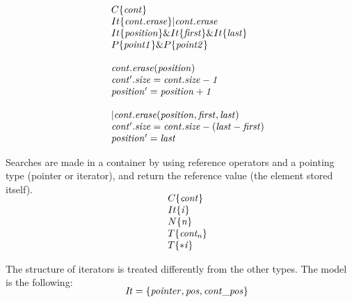 \documentclass[a4paper]{llncs}
\begin{document}
\[\begin{array}{r@{\:\:}c@{\:\:}l}\label{erase-model}
\\[-5ex]
\ &  & \:	C\{\mathit{cont}\}\\
	&  & \: It\{\mathit{cont.erase}\}|\mathit{cont.erase}\\
	&  & \: It\{\mathit{position}\} \& It\{\mathit{first}\} \& It\{\mathit{last}\}\\
	&  & \: P\{\mathit{point1}\} \& P\{\mathit{point2}\}\\
	& &	\: \\
	&  & \: \mathit{cont.erase} (\mathit{position})\\
	&  & \:	\mathit{cont'.size} = \mathit{cont.size} - \mathit{1}\\
	&   & \:	\mathit{position'} = \mathit{position} + \mathit{1}\\
	& &	\: \\
	&  & \:| \mathit{cont.erase} (\mathit{position}, \mathit{first}, \mathit{last})\\
	&   & \:	\mathit{cont'.size} = \mathit{cont.size} -(\mathit{last} - \mathit{first})\\
	&   & \:	\mathit{position'} = \mathit{last}\\
\end{array}
\]

	Searches are made in a container by using reference operators and a pointing type (pointer or iterator), and return the reference value (the element stored itself).\\

\[\begin{array}{r@{\:\:}c@{\:\:}l}\label{search-model}
\\[-5ex]
\ &  &\:	C\{\mathit{cont}\}\\
	&  &\:  It\{\mathit{i}\}\\
	&  &\:  N\{\mathit{n}\}\\
	&  &\:  T\{\mathit{cont_n}\}\\
	&  &\:  T\{\mathit{*i}\}\\
\end{array}
\]

	The structure of iterators is treated differently from the other types. The model is the following:\\
	\[\begin{array}{r@{\:\:}c@{\:\:}l}\label{iterator-model}
\\[-5ex]
 \ &  &\: \mathit{It} = \{ \mathit{pointer}, \mathit{pos}, \mathit{cont\_pos}\} \:\\
               
\end{array}
\]
	
\end{document}
